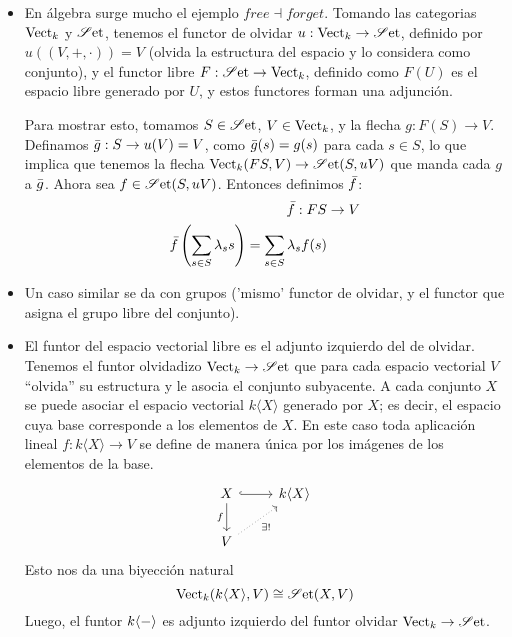 \begin{example}
\begin{itemize}
    \item En álgebra surge mucho el ejemplo $free\dashv forget$. Tomando las categorias $\mathrm{Vect}_k$ y $\mathscr{S}\mathrm{et}$, tenemos el functor de olvidar $u:\mathrm{Vect}_k\to\mathscr{S}\mathrm{et}$, definido por $u((V,+,\cdot))= V$ (olvida la estructura del espacio y lo considera como conjunto), y el functor libre $F:\mathscr{S}\mathrm{et}\to\mathrm{Vect}_k$, definido como $F(U)$ es el espacio libre generado por $U$, y estos functores forman una adjunción.
    
    Para mostrar esto, tomamos $S\in\mathscr{S}\mathrm{et}$, $V\in\mathrm{Vect}_k$, y la flecha $g:F(S)\to V$.
    Definamos $\Bar{g}:S\to u(V)=V$, como $\Bar{g}(s)=g(s)$ para cada $s\in S$, lo que implica que tenemos la flecha $\mathrm{Vect}_k(FS,V)\to\mathscr{S}\mathrm{et}(S,uV)$ que manda cada $g$ a $\Bar{g}$.
    Ahora sea $f\in\mathscr{S}\mathrm{et}(S,uV)$. Entonces definimos $\Bar{f}$:
    \begin{align*}
        \Bar{f}:FS & \to V \\
        \Bar{f}\left(\sum_{s\in S}\lambda_ss\right)=\sum_{s\in S}\lambda_s f(s)
    \end{align*}
    \item Un caso similar se da con grupos ('mismo' functor de olvidar, y el functor que asigna el grupo libre del conjunto).
    \item El funtor del espacio vectorial libre es el
      adjunto izquierdo del de olvidar.
      Tenemos el funtor olvidadizo $\mathrm{Vect}_k\to\mathscr{S}\mathrm{et}$ que para cada
      espacio vectorial $V$ “olvida” su estructura y le asocia el
      conjunto subyacente. A cada conjunto $X$ se puede asociar
      el espacio vectorial $k\langle X\rangle$ generado por $X$;
      es decir, el espacio cuya base corresponde a los elementos
      de $X$. En este caso toda aplicación lineal $f:k\langle
      X\rangle\to V$ se define de manera única por los imágenes
      de los elementos de la base.
      \[\begin{tikzcd}
    	{X} & {k\langle X\rangle} \\
    	{V}
    	\arrow["{f}"', from=1-1, to=2-1]
    	\arrow[from=1-1, to=1-2, hook]
    	\arrow["{\exists !}"', from=2-1, to=1-2, dotted]
    \end{tikzcd}\]
    Esto nos da una biyección natural
    $$\mathrm{Vect}_k(k\langle X\rangle, V)
    \cong
    \mathscr{S}\mathrm{et}(X,V)$$
    Luego, el funtor $k\langle-\rangle$ es adjunto izquierdo del
    funtor olvidar $\mathrm{Vect}_k\to\mathscr{S}\mathrm{et}$.
    

\end{itemize}
\end{example}
